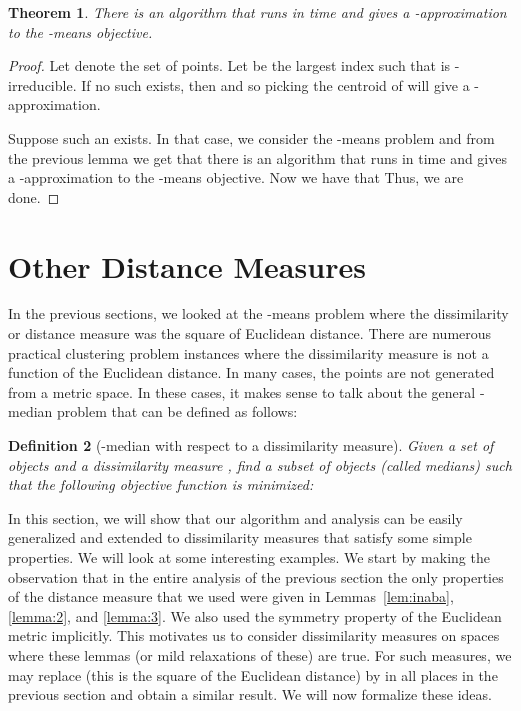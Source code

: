 \documentclass[a4paper]{article}
\newtheorem{theorem}{Theorem}
\newtheorem{definition}[theorem]{Definition}
\begin{document}
\begin{theorem}
There is an algorithm that runs in time  and
gives a -approximation to the -means objective.
\end{theorem}
\begin{proof}
Let  denote the set of points.  Let  be the largest index such that  is -irreducible.
If no such  exists, then 
and so picking the centroid of  will give a -approximation.

Suppose such an  exists. In that case, we consider the -means problem and from the previous lemma
we get that there is an algorithm that runs in time  and gives a
-approximation to the -means objective.
Now we have that 
Thus, we are done.
\end{proof}





\section{Other Distance Measures}\label{sec:other}
In the previous sections, we looked at the -means problem where the dissimilarity or distance measure was the square of Euclidean distance. There are numerous practical clustering problem instances where the dissimilarity measure is not a function of the Euclidean distance. In many cases, the points are not generated from a metric space. In these cases, it makes sense to talk about the general -median problem that can be defined as follows:

\begin{definition}[-median with respect to a dissimilarity measure]
Given a set of  objects  and a dissimilarity measure , find a subset  of  objects (called medians) such that the following objective function is minimized:

\end{definition}

In this section, we will show that our algorithm and analysis can be easily generalized and extended to dissimilarity measures that satisfy some simple properties. We will look at some interesting examples.
We start by making the observation that in the entire analysis of the previous section the only properties of the distance measure that we used were given in Lemmas~\ref{lem:inaba}, \ref{lemma:2}, and \ref{lemma:3}. We also used the symmetry property of the Euclidean metric implicitly. This motivates us to consider dissimilarity measures on spaces where these lemmas  (or mild relaxations of these) are true. For such measures, we may replace  (this is the square of the Euclidean distance) by  in all places in the previous section and obtain a similar result. We will now formalize these ideas.
\end{document}
